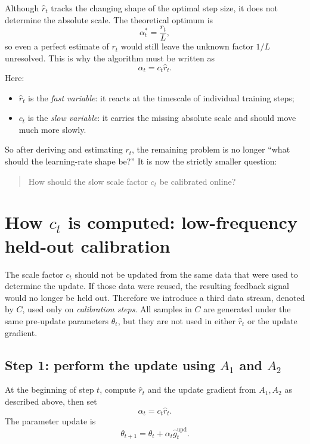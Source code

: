 \documentclass[11pt]{article}
\begin{document}
Although $\hat r_t$ tracks the changing shape of the optimal step size, it does not determine the absolute scale. The theoretical optimum is
\[
\alpha_t^* = \frac{r_t}{L},
\]
so even a perfect estimate of $r_t$ would still leave the unknown factor $1/L$ unresolved. This is why the algorithm must be written as
\begin{equation}
\alpha_t = c_t\hat r_t.
\label{eq:alpha-decomp-final}
\end{equation}
Here:
\begin{itemize}
    \item $\hat r_t$ is the \emph{fast variable}: it reacts at the timescale of individual training steps;
    \item $c_t$ is the \emph{slow variable}: it carries the missing absolute scale and should move much more slowly.
\end{itemize}

So after deriving and estimating $r_t$, the remaining problem is no longer ``what should the learning-rate shape be?'' It is now the strictly smaller question:
\begin{quote}
How should the slow scale factor $c_t$ be calibrated online?
\end{quote}

\section{How $c_t$ is computed: low-frequency held-out calibration}

The scale factor $c_t$ should not be updated from the same data that were used to determine the update. If those data were reused, the resulting feedback signal would no longer be held out. Therefore we introduce a third data stream, denoted by $C$, used only on \emph{calibration steps}. All samples in $C$ are generated under the same pre-update parameters $\theta_t$, but they are not used in either $\hat r_t$ or the update gradient.

\subsection{Step 1: perform the update using $A_1$ and $A_2$}
At the beginning of step $t$, compute $\hat r_t$ and the update gradient from $A_1,A_2$ as described above, then set
\[
\alpha_t = c_t\hat r_t.
\]
The parameter update is
\begin{equation}
\theta_{t+1}
=
\theta_t + \alpha_t \hat g_t^{\mathrm{upd}}.
\label{eq:update-with-c}
\end{equation}
\end{document}
